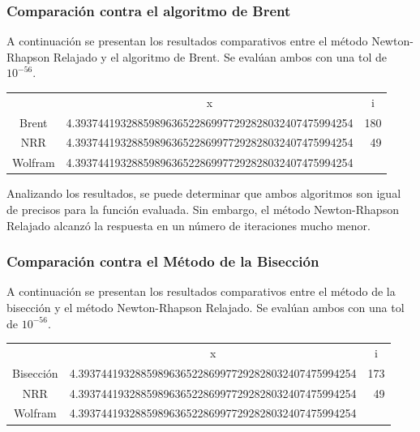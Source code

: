 \documentclass[a4paper,12pt]{article}
\begin{document}
\subsubsection{Comparación contra el algoritmo de Brent}

A continuación se presentan los resultados comparativos entre el método Newton-Rhapson Relajado y el algoritmo de Brent. Se evalúan ambos con una tol de $10^{-56}$. \par

\begin{table}[ht!]
\begin{tabular}{crr}
        & \multicolumn{1}{c}{x}                                & \multicolumn{1}{c}{i} \\
Brent   & 4.3937441932885989636522869977292828032407475994254  & 180                  \\
NRR     & 4.3937441932885989636522869977292828032407475994254  & 49                   \\
Wolfram & 4.3937441932885989636522869977292828032407475994254 & \multicolumn{1}{l}{} 
\end{tabular}
\end{table}

Analizando los resultados, se puede determinar que ambos algoritmos son igual de precisos para la función evaluada. Sin embargo, el método Newton-Rhapson Relajado alcanzó la respuesta en un número de iteraciones mucho menor. \par

\subsubsection{Comparación contra el Método de la Bisección}

A continuación se presentan los resultados comparativos entre el método de la bisección y el método Newton-Rhapson Relajado. Se evalúan ambos con una tol de $10^{-56}$. \par

\begin{table}[ht!]
\begin{tabular}{crr}
          & \multicolumn{1}{c}{x}                                & \multicolumn{1}{c}{i} \\
Bisección & 4.3937441932885989636522869977292828032407475994254 & 173                   \\
NRR       & 4.3937441932885989636522869977292828032407475994254  & 49                   \\
Wolfram   & 4.3937441932885989636522869977292828032407475994254  & \multicolumn{1}{l}{} 
\end{tabular}
\end{table}
\end{document}
